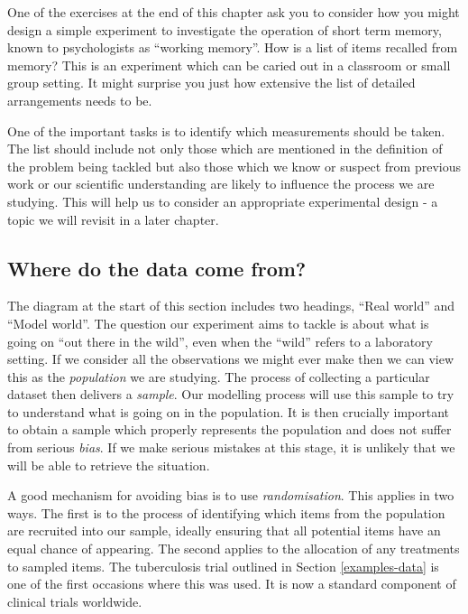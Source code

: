 \documentclass[
]{book}
\begin{document}
One of the exercises at the end of this chapter ask you to consider how you might design a simple experiment to investigate the operation of short term memory, known to psychologists as ``working memory''. How is a list of items recalled from memory? This is an experiment which can be caried out in a classroom or small group setting. It might surprise you just how extensive the list of detailed arrangements needs to be.

One of the important tasks is to identify which measurements should be taken. The list should include not only those which are mentioned in the definition of the problem being tackled but also those which we know or suspect from previous work or our scientific understanding are likely to influence the process we are studying. This will help us to consider an appropriate experimental design - a topic we will revisit in a later chapter.

\subsection{Where do the data come from?}\label{where-data-subsection}

The diagram at the start of this section includes two headings, ``Real world'' and ``Model world''. The question our experiment aims to tackle is about what is going on ``out there in the wild'', even when the ``wild'' refers to a laboratory setting. If we consider all the observations we might ever make then we can view this as the \emph{population} we are studying. The process of collecting a particular dataset then delivers a \emph{sample}. Our modelling process will use this sample to try to understand what is going on in the population. It is then crucially important to obtain a sample which properly represents the population and does not suffer from serious \emph{bias}. If we make serious mistakes at this stage, it is unlikely that we will be able to retrieve the situation.

A good mechanism for avoiding bias is to use \emph{randomisation}. This applies in two ways. The first is to the process of identifying which items from the population are recruited into our sample, ideally ensuring that all potential items have an equal chance of appearing. The second applies to the allocation of any treatments to sampled items. The tuberculosis trial outlined in Section \ref{examples-data} is one of the first occasions where this was used. It is now a standard component of clinical trials worldwide.
\end{document}
